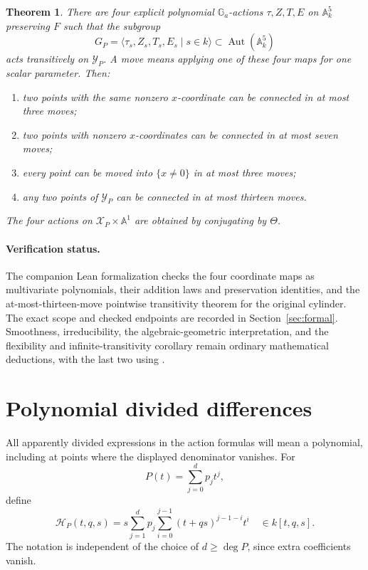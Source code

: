 \documentclass[11pt,letterpaper]{article}
\newcommand{\A}{\mathbb A}
\newcommand{\Ga}{\mathbb G_a}
\newcommand{\Aut}{\operatorname{Aut}}
\newcommand{\dd}{\mathcal H}
\newcommand{\Y}{\mathcal Y_P}
\newcommand{\X}{\mathcal X_P}
\newtheorem{theorem}{Theorem}[section]
\theoremstyle{remark}
\begin{document}
\begin{theorem}\label{thm:main}
There are four explicit polynomial $\Ga$-actions $\tau,Z,T,E$ on $\A^5_k$ preserving $F$ such that the subgroup
\[
G_P=\langle\tau_s,Z_s,T_s,E_s\mid s\in k\rangle\subset\Aut(\A^5_k)
\]
acts transitively on $\Y$. A move means applying one of these four maps for one scalar parameter. Then:
\begin{enumerate}[label=\textup{(\roman*)},leftmargin=2.2em,itemsep=0.15em]
\item two points with the same nonzero $x$-coordinate can be connected in at most three moves;
\item two points with nonzero $x$-coordinates can be connected in at most seven moves;
\item every point can be moved into $\{x\ne0\}$ in at most three moves;
\item any two points of $\Y$ can be connected in at most thirteen moves.
\end{enumerate}
The four actions on $\X\times\A^1$ are obtained by conjugating by $\Theta$.
\end{theorem}



\paragraph{Verification status.}
The companion Lean formalization checks the four coordinate maps as multivariate polynomials, their addition laws and preservation identities, and the at-most-thirteen-move pointwise transitivity theorem for the original cylinder. The exact scope and checked endpoints are recorded in Section~\ref{sec:formal}. Smoothness, irreducibility, the algebraic-geometric interpretation, and the flexibility and infinite-transitivity corollary remain ordinary mathematical deductions, with the last two using \cite{AFKKZ}.

\section{Polynomial divided differences}

All apparently divided expressions in the action formulas will mean a polynomial, including at points where the displayed denominator vanishes. For
\[
P(t)=\sum_{j=0}^{d}p_jt^j,
\]
define
\begin{equation}\label{eq:hpoly}
\dd_P(t,q,s)
=s\sum_{j=1}^{d}p_j\sum_{i=0}^{j-1}(t+qs)^{j-1-i}t^i
\quad\in k[t,q,s].
\end{equation}
The notation is independent of the choice of $d\ge\deg P$, since extra coefficients vanish.
\end{document}
